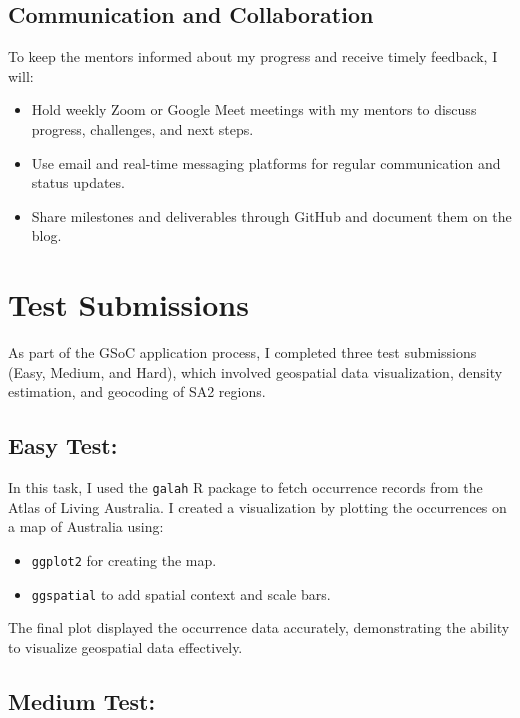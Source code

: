 \documentclass{article}
\newcommand{\code}[1]{\colorbox{customgray}{\texttt{#1}}}
\begin{document}
\subsection{Communication and Collaboration}
To keep the mentors informed about my progress and receive timely feedback, I will:
\begin{itemize}
    \item Hold weekly Zoom or Google Meet meetings with my mentors to discuss progress, challenges, and next steps.
    \item Use email and real-time messaging platforms for regular communication and status updates.
    \item Share milestones and deliverables through GitHub and document them on the blog.
\end{itemize}



\section{Test Submissions}

As part of the GSoC application process, I completed three test submissions (Easy, Medium, and Hard), which involved geospatial data visualization, density estimation, and geocoding of SA2 regions.

\subsection{Easy Test:}

In this task, I used the \code{galah} R package to fetch occurrence records from the Atlas of Living Australia. I created a visualization by plotting the occurrences on a map of Australia using:
\begin{itemize}
    \item \code{ggplot2} for creating the map.
    \item \code{ggspatial} to add spatial context and scale bars.
\end{itemize}

The final plot displayed the occurrence data accurately, demonstrating the ability to visualize geospatial data effectively.

\subsection{Medium Test:}
\end{document}
